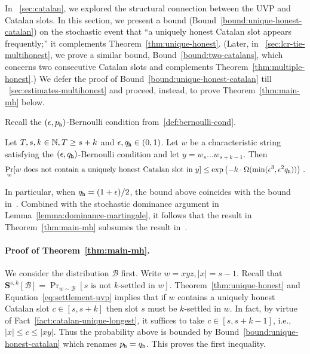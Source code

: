
In \Section~\ref{sec:catalan}, 
we explored the structural connection 
between the UVP and Catalan slots. 
In this section, we present a bound (Bound~\ref{bound:unique-honest-catalan}) 
on the stochastic event that ``a uniquely honest Catalan slot appears frequently;'' 
it complements Theorem~\ref{thm:unique-honest}. 
(Later, in \Section~\ref{sec:lcr-tie-multihonest}, 
we prove a similar bound, Bound~\ref{bound:two-catalans}, 
which concerns two consecutive Catalan slots and complements Theorem~\ref{thm:multiple-honest}.)
We defer the proof of Bound~\ref{bound:unique-honest-catalan} till \Section~\ref{sec:estimates-multihonest}
and proceed, instead, to prove Theorem~\ref{thm:main-mh} below.



Recall the $(\epsilon, p_{\mathtt{h}})$-Bernoulli condition from~\ref{def:bernoulli-cond}.
\begin{bound}\label{bound:unique-honest-catalan}
  Let $T, s, k \in \mathbb{N}, T \geq s + k$ and  $\epsilon, q_{\mathtt{h}} \in (0, 1)$. 
  Let $w$ be a characteristic string satisfying 
  the $(\epsilon, q_{\mathtt{h}})$-Bernoulli condition 
  and let $y = w_s \ldots w_{s+k-1}$.
  Then 
  \[
    \Pr_w[\text{$w$ does not contain a uniquely honest Catalan slot in $y$}]  
      \leq 
      \exp\left(
        -k\cdot \Omega(\min(\epsilon^3, \epsilon^2 q_{\mathtt{h}})) 
      \right)
      \,.
  \]
\end{bound}
In particular, 
when $q_{\mathtt{h}} = (1+\epsilon)/2$, 
the bound above coincides with the 
bound in~\citet{LinearConsistency}. 
Combined with the stochastic dominance argument in Lemma~\ref{lemma:dominance-martingale}, 
it follows that the result in Theorem~\ref{thm:main-mh} subsumes the result in~\citet{LinearConsistency}.







\paragraph{Proof of Theorem~\ref{thm:main-mh}.}

  We consider the distribution $\mathcal{B}$ first. 
  Write $w = xyz, |x| = s - 1$.
  Recall that  
  $
    \mathbf{S}^{s,k}[\mathcal{B}] 
    = \Pr_{w \sim \mathcal{B}}[\text{$s$ is not $k$-settled in $w$}]
  $. 
  Theorem~\ref{thm:unique-honest} and Equation~\eqref{eq:settlement-uvp} implies that 
  if $w$ contains a uniquely honest Catalan slot $c \in [s, s + k]$ 
  then slot $s$ must be $k$-settled in $w$. 
  In fact, by virtue of Fact~\ref{fact:catalan-unique-longest}, 
  it suffices to take $c \in [s, s + k - 1]$, 
  i.e., $|x| \leq c \leq |xy|$. 
  Thus the probability above is bounded by 
  Bound~\ref{bound:unique-honest-catalan} 
  which renames $p_{\mathtt{h}} = q_{\mathtt{h}}$.
  This proves the first inequality. 
  
